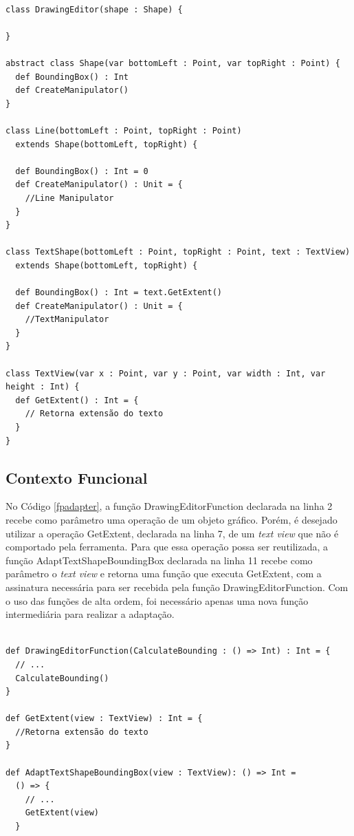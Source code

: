 \begin{lstlisting}[caption={Adapter Orientado a Objetos.},label=ooadapter]

class DrawingEditor(shape : Shape) {

}

abstract class Shape(var bottomLeft : Point, var topRight : Point) {
  def BoundingBox() : Int
  def CreateManipulator()
}

class Line(bottomLeft : Point, topRight : Point)
  extends Shape(bottomLeft, topRight) {

  def BoundingBox() : Int = 0
  def CreateManipulator() : Unit = {
    //Line Manipulator
  }
}

class TextShape(bottomLeft : Point, topRight : Point, text : TextView)
  extends Shape(bottomLeft, topRight) {

  def BoundingBox() : Int = text.GetExtent()
  def CreateManipulator() : Unit = {
    //TextManipulator
  }
}

class TextView(var x : Point, var y : Point, var width : Int, var height : Int) {
  def GetExtent() : Int = {
    // Retorna extensão do texto
  }
}

\end{lstlisting}

\subsection*{Contexto Funcional}

No Código \ref{fpadapter}, a função DrawingEditorFunction 
declarada na linha 2 recebe como parâmetro uma operação de um 
objeto gráfico. Porém, é desejado utilizar a operação 
GetExtent, declarada na linha 7, de um \textit{text view} 
que não é comportado pela ferramenta. Para que essa 
operação possa ser reutilizada, a função 
AdaptTextShapeBoundingBox declarada na linha 11 
recebe como parâmetro o \textit{text view} e retorna 
uma função que executa GetExtent, com a assinatura 
necessária para ser recebida pela função 
DrawingEditorFunction. Com o uso das funções de alta 
ordem, foi necessário apenas uma nova função intermediária 
para realizar a adaptação. 

\begin{lstlisting}[caption={Adapter Funcional.},label=fpadapter]
    
def DrawingEditorFunction(CalculateBounding : () => Int) : Int = {
  // ...
  CalculateBounding()
}

def GetExtent(view : TextView) : Int = {
  //Retorna extensão do texto
}

def AdaptTextShapeBoundingBox(view : TextView): () => Int =
  () => {
    // ...
    GetExtent(view)
  }

\end{lstlisting}
